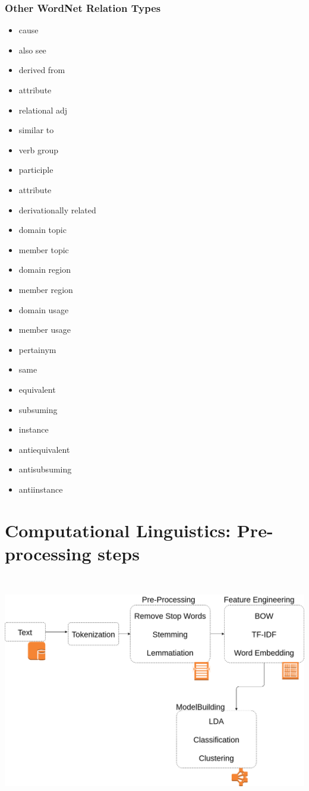 \subsubsection{Other WordNet Relation Types}
\begin{itemize}
\item cause
\item also see
\item derived from
\item attribute
\item relational adj
\item similar to
\item verb group
\item participle
\item attribute
\item derivationally related
\item domain topic
\item member topic
\item domain region
\item member region
\item domain usage
\item member usage
\item pertainym
\item same
\item equivalent
\item subsuming
\item instance
\item antiequivalent
\item antisubsuming
\item antiinstance
\end{itemize}

\section{Computational Linguistics: Pre-processing steps}

\includegraphics[width=6in,height=4in]{NLP-TextAnalysis.png}

